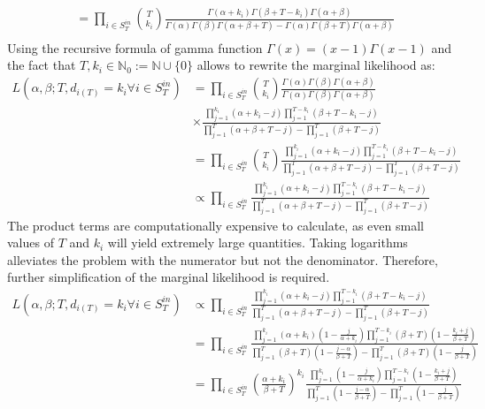 \documentclass[a4paper, 12pt]{article}
\begin{document}
\begin{itemize}
\begin{align*}
        &= \prod_{i \in S_T^{in}} \binom{T}{k_i} \frac{\Gamma(\alpha + k_i)\Gamma(\beta + T - k_i)\Gamma(\alpha + \beta)}{\Gamma(\alpha)\Gamma(\beta)\Gamma(\alpha + \beta + T) - \Gamma(\alpha)\Gamma(\beta + T)\Gamma(\alpha + \beta)}\\
    \end{align*}
    Using the recursive formula of gamma function $\Gamma(x) = (x - 1)\Gamma(x - 1)$ and the fact that $T, k_i \in \mathbb{N}_0 := \mathbb{N} \cup \{0\}$ allows to rewrite the marginal likelihood as:
    \begin{align*}
        L(\alpha, \beta; T, d_{i(T)} = k_i \forall i \in S_T^{in}) &= \prod_{i \in S_T^{in}} \binom{T}{k_i} \frac{\Gamma(\alpha) \Gamma(\beta) \Gamma(\alpha + \beta)}{\Gamma(\alpha)\Gamma(\beta)\Gamma(\alpha + \beta)}\\
        &\times \frac{\prod_{j=1}^{k_i} (\alpha + k_i - j)\prod_{j=1}^{T - k_i} (\beta + T - k_i - j)}{\prod_{j=1}^T(\alpha + \beta + T - j) - \prod_{j=1}^T (\beta + T - j)} \\
        &= \prod_{i \in S_T^{in}} \binom{T}{k_i} \frac{\prod_{j=1}^{k_i} (\alpha + k_i - j) \prod_{j=1}^{T - k_i} (\beta + T - k_i - j)}{\prod_{j=1}^T (\alpha + \beta + T - j) - \prod_{j=1}^T (\beta + T - j )}\\
        &\propto \prod_{i \in S_T^{in}} \frac{\prod_{j=1}^{k_i} (\alpha + k_i - j) \prod_{j=1}^{T - k_i} (\beta + T - k_i - j)}{\prod_{j=1}^T (\alpha + \beta + T - j) - \prod_{j=1}^T (\beta + T - j )}
    \end{align*}
    The product terms are computationally expensive to calculate, as even small values of $T$ and $k_i$ will yield extremely large quantities. Taking logarithms alleviates the problem with the numerator but not the denominator. Therefore, further simplification of the marginal likelihood is required.
    \begin{align}
        L(\alpha, \beta; T, d_{i(T)} = k_i \forall i \in S_T^{in}) &\propto \prod_{i \in S_T^{in}} \frac{\prod_{j=1}^{k_i} (\alpha + k_i - j) \prod_{j=1}^{T - k_i} (\beta + T - k_i - j)}{\prod_{j=1}^T (\alpha + \beta + T - j) - \prod_{j=1}^T (\beta + T - j )} \nonumber \\
        &= \prod_{i \in S_T^{in}} \frac{\prod_{j=1}^{k_i} (\alpha + k_i)(1 - \frac{j}{\alpha + k_i}) \prod_{j=1}^{T - k_i} (\beta + T)(1 - \frac{k_i + j}{\beta + T})}{\prod_{j=1}^T (\beta + T)(1 -\frac{j - \alpha}{\beta + T}) - \prod_{j=1}^T (\beta + T)(1 - \frac{j}{\beta + T} )} \nonumber \\
        &= \prod_{i \in S_T^{in}} \left(\frac{\alpha + k_i}{\beta + T}\right)^{k_i} \frac{\prod_{j=1}^{k_i} (1 - \frac{j}{\alpha + k_i}) \prod_{j=1}^{T - k_i} (1 - \frac{k_i + j}{\beta + T})}{\prod_{j=1}^T (1 -\frac{j - \alpha}{\beta + T}) - \prod_{j=1}^T (1 - \frac{j}{\beta + T} )} \nonumber \\

\end{align}
\end{itemize}
\end{document}
